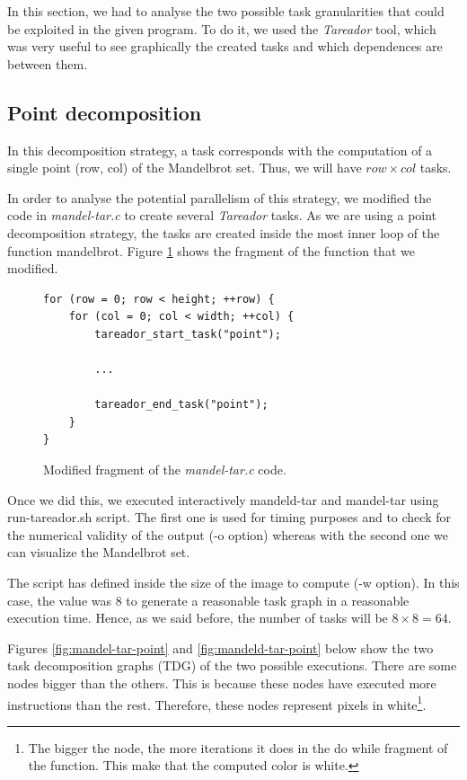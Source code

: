 \documentclass[12pt, a4paper]{article}
\begin{document}
In this section, we had to analyse the two possible task granularities that could be exploited in the given program. To do it, we used the \textit{Tareador} tool, which was very useful to see graphically the created tasks and which dependences are between them.

\subsection{Point decomposition}

In this decomposition strategy, a task corresponds with the computation of a single point (row, col) of the Mandelbrot set. Thus, we will have $row \times col$ tasks.

In order to analyse the potential parallelism of this strategy, we modified the code in \textit{mandel-tar.c} to create several \textit{Tareador} tasks. As we are using a point decomposition strategy, the tasks are created inside the most inner loop of the function mandelbrot.  Figure \ref{code:mandeltarPoint} shows the fragment of the function that we modified.

\begin{figure}[H]
\begin{lstlisting}
for (row = 0; row < height; ++row) {
	for (col = 0; col < width; ++col) {
		tareador_start_task("point");
		
		...
		
		tareador_end_task("point");
	}
}
\end{lstlisting}
\caption{Modified fragment of the \textit{mandel-tar.c} code.}
\label{code:mandeltarPoint}
\end{figure}

Once we did this, we executed interactively mandeld-tar and mandel-tar using run-tareador.sh script. The first one is used for timing purposes and to check for the numerical validity of the output (-o option) whereas with the second one we can visualize the Mandelbrot set.

The script has defined inside the size of the image to compute (-w option). In this case, the value was 8 to generate a reasonable task graph in a reasonable execution time. Hence, as we said before, the number of tasks will be $8 \times 8 = 64$.

Figures \ref{fig:mandel-tar-point} and \ref{fig:mandeld-tar-point} below show the two task decomposition graphs (TDG) of the two possible executions. There are some nodes bigger than the others. This is because these nodes have executed more instructions than the rest. Therefore, these nodes represent pixels in white\footnote{The bigger the node, the more iterations it does in the do while fragment of the function. This make that the computed color is white.}.
\end{document}
